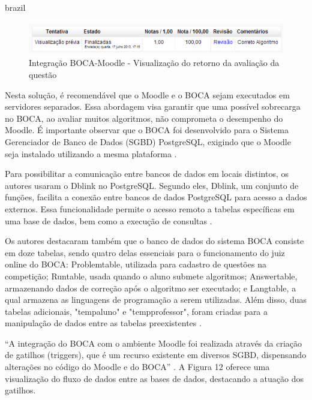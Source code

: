 \begin{otherlanguage*}{brazil}
\begin{figure}[h!]
	   \centering
            \caption{Integração BOCA-Moodle - Visualização do retorno da avaliação da questão}
            \label{fig:ModeloConceitual}
	   	\includegraphics[scale=0.3]{pictures/BOCA_visualizacao.png}
\end{figure}

Nesta solução, é recomendável que o Moodle e o BOCA sejam executados em servidores separados. Essa abordagem visa garantir que uma possível sobrecarga no BOCA, ao avaliar muitos algoritmos, não comprometa o desempenho do Moodle. É importante observar que o BOCA foi desenvolvido para o Sistema Gerenciador de Banco de Dados (SGBD) PostgreSQL, exigindo que o Moodle seja instalado utilizando a mesma plataforma \cite[p.~27-28]{galasso}. 

Para possibilitar a comunicação entre bancos de dados em locais distintos, os autores usaram o Dblink no PostgreSQL. Segundo eles, Dblink, um conjunto de funções, facilita a conexão entre bancos de dados PostgreSQL para acesso a dados externos. Essa funcionalidade permite o acesso remoto a tabelas específicas em uma base de dados, bem como a execução de consultas \cite[p.~27-28]{galasso}.

Os autores destacaram também que o banco de dados do sistema BOCA consiste em doze tabelas, sendo quatro delas essenciais para o funcionamento do juiz online do BOCA: Problemtable, utilizada para cadastro de questões na competição; Runtable, usada quando o aluno submete algoritmos; Answertable, armazenando dados de correção após o algoritmo ser executado; e Langtable, a qual armazena as linguagens de programação a serem utilizadas. Além disso, duas tabelas adicionais, "tempaluno" e "tempprofessor", foram criadas para a manipulação de dados entre as tabelas preexistentes \cite[p.~27-28]{galasso}. 

“A integração do BOCA com o ambiente Moodle foi realizada através da criação de gatilhos (triggers), que é um recurso existente em diversos SGBD, dispensando alterações no código do Moodle e do BOCA” \cite[p.~28-29]{galasso}. A Figura 12 oferece uma visualização do fluxo de dados entre as bases de dados, destacando a atuação dos gatilhos.


\end{otherlanguage*}
